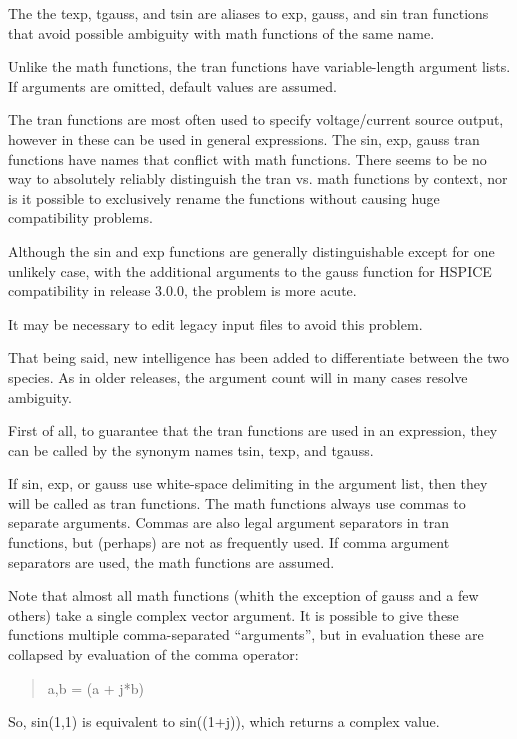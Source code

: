 The the {\vt texp}, {\vt tgauss}, and {\vt tsin} are aliases to {\vt
exp}, {\vt gauss}, and {\vt sin} tran functions that avoid possible
ambiguity with math functions of the same name.

Unlike the math functions, the tran functions have variable-length
argument lists.  If arguments are omitted, default values are assumed. 

The tran functions are most often used to specify voltage/current
source output, however in {\WRspice} these can be used in general
expressions.  The {\vt sin}, {\vt exp}, {\vt gauss} tran functions
have names that conflict with math functions.  There seems to be no
way to absolutely reliably distinguish the tran vs.  math functions by
context, nor is it possible to exclusively rename the functions
without causing huge compatibility problems.

Although the {\vt sin} and {\vt exp} functions are generally
distinguishable except for one unlikely case, with the additional
arguments to the {\vt gauss} function for HSPICE compatibility in
{\WRspice} release 3.0.0, the problem is more acute.

It may be necessary to edit legacy {\WRspice} input files to avoid
this problem.

That being said, new intelligence has been added to differentiate
between the two species.  As in older releases, the argument count
will in many cases resolve ambiguity.

First of all, to guarantee that the tran functions are used in an
expression, they can be called by the synonym names {\vt tsin}, {\vt
texp}, and {\vt tgauss}.

If {\vt sin}, {\vt exp}, or {\vt gauss} use white-space delimiting in
the argument list, then they will be called as tran functions.  The
math functions always use commas to separate arguments.  Commas are
also legal argument separators in tran functions, but (perhaps) are
not as frequently used.  If comma argument separators are used, the
math functions are assumed.

Note that almost all math functions (whith the exception of {\vt
gauss} and a few others) take a single complex vector argument.  It is
possible to give these functions multiple comma-separated
``arguments'', but in evaluation these are collapsed by evaluation of
the comma operator:
\begin{quote}\vt
a,b = (a + j*b)
\end{quote}
So, {\vt sin(1,1)} is equivalent to {\vt sin((1+j))}, which returns a
complex value.

